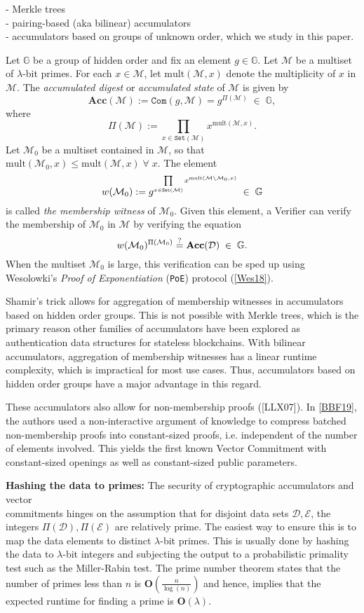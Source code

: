 \documentclass[11pt, lettersize, notitlepage, leqno, footskip=0.6cm]{article}
\newcommand{\pl}{\prod\limits}
\newcommand{\ttt}{\texttt}
\newcommand{\bG}{\mathbb{G}}
\newcommand{\Acc}{\mbf{Acc}}
\newcommand{\sett}{\ttt{Set}}
\newcommand{\mult}{\mr{mult}}
\newcommand{\mc}{\mathcal}
\newcommand{\mb}{\mathbb}
\newcommand{\mbf}{\mathbf}
\newcommand{\mr}{\mathrm}
\newcommand{\sm}{\setminus}
\newcommand{\lam}{\lambda}
\newcommand{\mcM}{\mc{M}}
\newcommand{\vs}{\vspace{-0.15cm}}
\newcommand{\noin}{\noindent}
\newcommand{\sta}{\stackrel{?}{=}}
\numberwithin{equation}{section}
\begin{document}
\noin - Merkle trees\\
- pairing-based (aka bilinear) accumulators \\  
- accumulators based on groups of unknown order, which we study in this paper. 

Let $\mb{G}$ be a group of hidden order and fix an element $g \in\mb{G}$. Let $\mc{M}$ be a multiset of $\lam$-bit primes. For each $x\in \mc{M}$, let $\mult(\mc{M},x)$ denote the multiplicity of $x$ in $\mcM$. The \textit{accumulated digest} or \textit{accumulated state} of $\mc{M}$ is given by \vs $$\Acc(\mc{M}):= \ttt{Com}(g,\mcM) =   g^{\Pi(\mc{M})} \;\in\;\bG,$$ where $$\Pi(\mc{M}) := \pl_{x\in \sett(\mc{M})} x^{\mult(\mc{M},x)} .$$ Let $\mc{M}_0$ be a multiset contained in $\mc{M}$, so that  $\mult(\mc{M}_0,x)\leq \mult(\mc{M},x)\;\forall\;x$. The element \vs $$w(\mc{M}_0):= g^{\pl_{x\in \sett(\mc{M})} x^{\mult(\mc{M}\sm \mc{M}_0 ,x)}}\;\in\;\mb{G} \vs $$ is called \textit{the membership witness} of $\mc{M}_0$. Given this element, a Verifier can verify the membership of $\mc{M}_0$ in $\mc{M}$ by verifying the equation \vspace{-0.2cm} $$w(\mc{M}_0)^{\Pi(\mc{M}_0)} \sta \Acc(\mc{D})\;\in\;\bG. \vs $$ When the multiset $\mc{M}_0$ is large, this verification can be sped up using Wesolowki's \textit{Proof of Exponentiation} (\verb|PoE|) protocol (\hyperlink{Wes18}{[Wes18]}).

Shamir's trick allows for aggregation of membership witnesses in accumulators based on hidden order groups. This is not possible with Merkle trees, which is the primary reason other families of accumulators have been explored as authentication data structures for stateless blockchains. With bilinear accumulators, aggregation of membership witnesses has a linear runtime complexity, which is impractical for most use cases. Thus, accumulators based on hidden order groups have a major advantage in this regard.

These accumulators also allow for non-membership proofs ([LLX07]). In \hyperlink{BBF19}{[BBF19]}, the authors used a non-interactive argument of knowledge to compress batched non-membership proofs into constant-sized proofs, i.e. independent of the number of elements involved. This yields the first known Vector Commitment with constant-sized openings as well as  constant-sized public parameters.\vspace{0.15cm}

\noin \textbf{Hashing the data to primes:} The security of cryptographic accumulators and vector\\ commitments hinges on the assumption that for disjoint data sets $\mc{D},\mc{E}$, the integers $\Pi(\mc{D}), \Pi(\mc{E})$ are relatively prime. The easiest way to ensure this is to map the data elements to distinct $\lam$-bit primes. This is usually done by hashing the data to $\lam$-bit integers and subjecting the output to a probabilistic primality test such as the Miller-Rabin test. The prime number theorem states that the number of primes less than $n$ is $\mbf{O}(\frac{n}{\log(n)})$ and hence, implies that the expected runtime for finding a prime is $\mbf{O}(\lam)$.
\end{document}
